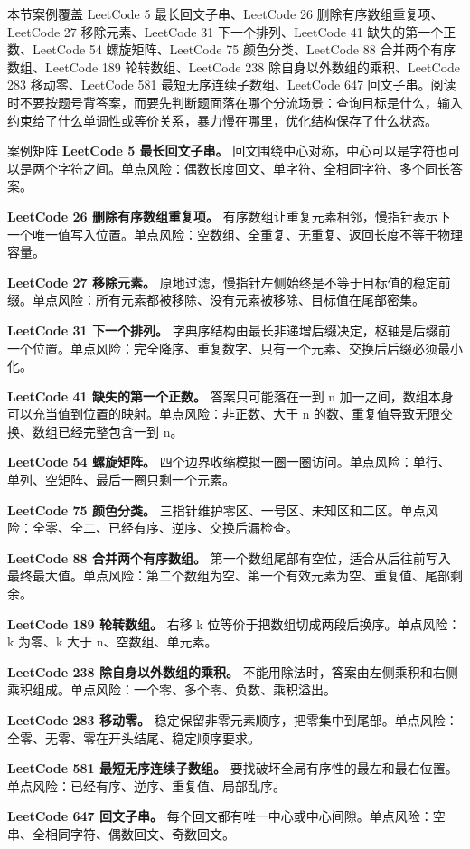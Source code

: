 本节案例覆盖 LeetCode 5 最长回文子串、LeetCode 26 删除有序数组重复项、LeetCode 27 移除元素、LeetCode 31 下一个排列、LeetCode 41 缺失的第一个正数、LeetCode 54 螺旋矩阵、LeetCode 75 颜色分类、LeetCode 88 合并两个有序数组、LeetCode 189 轮转数组、LeetCode 238 除自身以外数组的乘积、LeetCode 283 移动零、LeetCode 581 最短无序连续子数组、LeetCode 647 回文子串。阅读时不要按题号背答案，而要先判断题面落在哪个分流场景：查询目标是什么，输入约束给了什么单调性或等价关系，暴力慢在哪里，优化结构保存了什么状态。

\begin{principlebox}{案例矩阵}
\textbf{LeetCode 5 最长回文子串。}
回文围绕中心对称，中心可以是字符也可以是两个字符之间。单点风险：偶数长度回文、单字符、全相同字符、多个同长答案。

\textbf{LeetCode 26 删除有序数组重复项。}
有序数组让重复元素相邻，慢指针表示下一个唯一值写入位置。单点风险：空数组、全重复、无重复、返回长度不等于物理容量。

\textbf{LeetCode 27 移除元素。}
原地过滤，慢指针左侧始终是不等于目标值的稳定前缀。单点风险：所有元素都被移除、没有元素被移除、目标值在尾部密集。

\textbf{LeetCode 31 下一个排列。}
字典序结构由最长非递增后缀决定，枢轴是后缀前一个位置。单点风险：完全降序、重复数字、只有一个元素、交换后后缀必须最小化。

\textbf{LeetCode 41 缺失的第一个正数。}
答案只可能落在一到 n 加一之间，数组本身可以充当值到位置的映射。单点风险：非正数、大于 n 的数、重复值导致无限交换、数组已经完整包含一到 n。

\textbf{LeetCode 54 螺旋矩阵。}
四个边界收缩模拟一圈一圈访问。单点风险：单行、单列、空矩阵、最后一圈只剩一个元素。

\textbf{LeetCode 75 颜色分类。}
三指针维护零区、一号区、未知区和二区。单点风险：全零、全二、已经有序、逆序、交换后漏检查。

\textbf{LeetCode 88 合并两个有序数组。}
第一个数组尾部有空位，适合从后往前写入最终最大值。单点风险：第二个数组为空、第一个有效元素为空、重复值、尾部剩余。

\textbf{LeetCode 189 轮转数组。}
右移 k 位等价于把数组切成两段后换序。单点风险：k 为零、k 大于 n、空数组、单元素。

\textbf{LeetCode 238 除自身以外数组的乘积。}
不能用除法时，答案由左侧乘积和右侧乘积组成。单点风险：一个零、多个零、负数、乘积溢出。

\textbf{LeetCode 283 移动零。}
稳定保留非零元素顺序，把零集中到尾部。单点风险：全零、无零、零在开头结尾、稳定顺序要求。

\textbf{LeetCode 581 最短无序连续子数组。}
要找破坏全局有序性的最左和最右位置。单点风险：已经有序、逆序、重复值、局部乱序。

\textbf{LeetCode 647 回文子串。}
每个回文都有唯一中心或中心间隙。单点风险：空串、全相同字符、偶数回文、奇数回文。

\end{principlebox}

